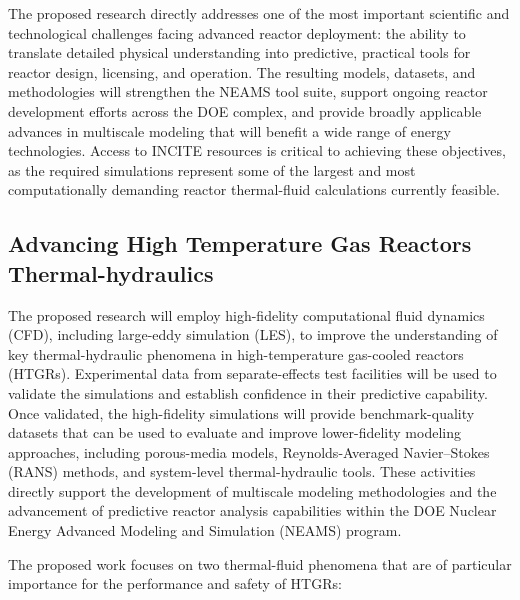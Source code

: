 The proposed research directly addresses one of the most important scientific and technological challenges facing advanced reactor deployment: the ability to translate detailed physical understanding into predictive, practical tools for reactor design, licensing, and operation. The resulting models, datasets, and methodologies will strengthen the NEAMS tool suite, support ongoing reactor development efforts across the DOE complex, and provide broadly applicable advances in multiscale modeling that will benefit a wide range of energy technologies. Access to INCITE resources is critical to achieving these objectives, as the required simulations represent some of the largest and most computationally demanding reactor thermal-fluid calculations currently feasible.

\subsection*{Advancing High Temperature Gas Reactors Thermal-hydraulics}

The proposed research will employ high-fidelity computational fluid dynamics (CFD), including large-eddy simulation (LES), to improve the understanding of key thermal-hydraulic phenomena in high-temperature gas-cooled reactors (HTGRs). Experimental data from separate-effects test facilities will be used to validate the simulations and establish confidence in their predictive capability. Once validated, the high-fidelity simulations will provide benchmark-quality datasets that can be used to evaluate and improve lower-fidelity modeling approaches, including porous-media models, Reynolds-Averaged Navier--Stokes (RANS) methods, and system-level thermal-hydraulic tools. These activities directly support the development of multiscale modeling methodologies and the advancement of predictive reactor analysis capabilities within the DOE Nuclear Energy Advanced Modeling and Simulation (NEAMS) program.

The proposed work focuses on two thermal-fluid phenomena that are of particular importance for the performance and safety of HTGRs:

